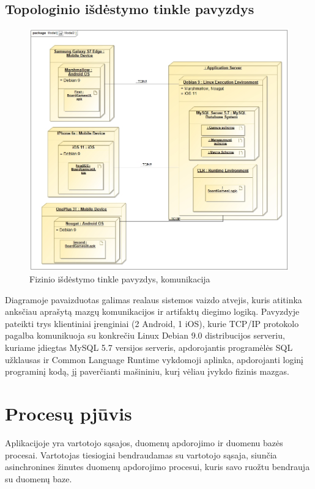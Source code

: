 \documentclass{VUMIFPSkursinis}
\begin{document}
	\subsection{Topologinio išdėstymo tinkle pavyzdys}
				\begin{figure}[H]
				\centering
				\includegraphics[scale=0.4]{img/TopologyExample}
				\caption{Fizinio išdėstymo tinkle pavyzdys, komunikacija}
				\label{img:TopologyExample}
			\end{figure}
		Diagramoje pavaizduotas galimas realaus sistemos vaizdo atvejis, kuris atitinka 		anksčiau aprašytą mazgų komunikacijos ir artifaktų diegimo logiką. Pavyzdyje 			pateikti trys klientiniai įrenginiai (2 Android, 1 iOS), kurie TCP/IP protokolo 		pagalba komunikuoja su konkrečiu Linux Debian 9.0 distribucijos serveriu, kuriame 			įdiegtas MySQL 5.7 versijos serveris, apdorojantis programėlės SQL užklausas ir 		Common Language Runtime vykdomoji aplinka, apdorojanti loginį programinį kodą, jį 			paverčianti mašininiu, kurį vėliau įvykdo fizinis mazgas.
			
\section{Procesų pjūvis}
Aplikacijoje yra vartotojo sąsajos, duomenų apdorojimo ir duomenu bazės procesai. 
Vartotojas tiesiogiai bendraudamas su vartotojo sąsaja, siunčia asinchronines 
žinutes duomenų apdorojimo procesui, kuris savo ruožtu bendrauja su duomenų baze.
\end{document}
